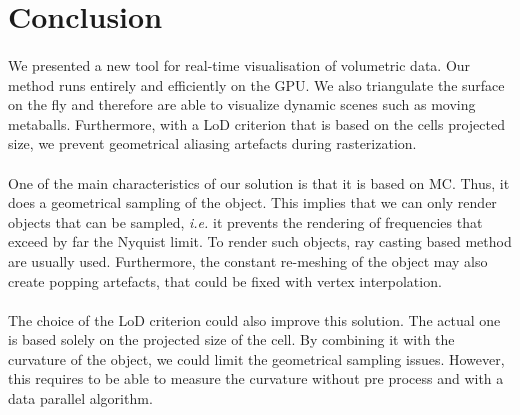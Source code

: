 \section{Conclusion}

\paragraph{}
We presented a new tool for real-time visualisation of volumetric data.
Our method runs entirely and efficiently on the GPU.
We also triangulate the surface on the fly and therefore are able to visualize dynamic scenes such as moving metaballs.
Furthermore, with a LoD criterion that is based on the cells projected size, we prevent geometrical aliasing artefacts during rasterization.

\paragraph{}
One of the main characteristics of our solution is that it is based on MC.
Thus, it does a geometrical sampling of the object.
This implies that we can only render objects that can be sampled, \textit{i.e.} it prevents the rendering of frequencies that exceed by far the Nyquist limit.
To render such objects, ray casting based method are usually used.
Furthermore, the constant re-meshing of the object may also create popping artefacts, that could be fixed with vertex interpolation.

\paragraph{}
The choice of the LoD criterion could also improve this solution.
The actual one is based solely on the projected size of the cell. 
By combining it with the curvature of the object, we could limit the geometrical sampling issues.
However, this requires to be able to measure the curvature without pre process and with a data parallel algorithm.

